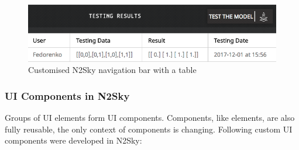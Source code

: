 \begin{figure}[htbp]
\begin{center}
  \includegraphics[scale=0.65]{components/3/components/nav_bar.png}
  \caption{Customised N2Sky navigation bar with a table}
  \label{fig:nav_bar}
\end{center}
\end{figure}

\subsubsection{UI Components in N2Sky}\label{UI Components in N2Sky}

Groups of UI elements form UI components. Components, like elements, are also fully reusable, the only context of components is changing. Following custom UI components were developed in N2Sky: 

